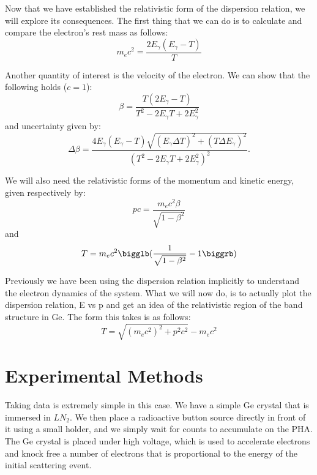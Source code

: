 \documentclass[reprint, nobibnotes, amssymb, amsmath, amsfonts, physics, mathtools, mathrsfs, floatfix]{revtex4-1}
\begin{document}
    Now that we have established the relativistic form of the dispersion relation, we will explore its consequences.  The first thing that we can do is to calculate and compare the electron's rest mass as follows:
    \begin{equation}
      m_ec^2 = \frac{2E_\gamma(E_\gamma - T)}{T} \label{eq:rest_mass}
    \end{equation}

    Another quantity of interest is the velocity of the electron.  We can show that the following holds ($c = 1$):
    \begin{equation}
      \beta = \frac{T(2E_\gamma - T)}{T^2 - 2E_\gamma T + 2E_\gamma^2} \label{eq:velocity}
    \end{equation}
    and uncertainty given by:
    \begin{equation}
      \Delta \beta = \frac{4E_\gamma(E_\gamma - T)\sqrt{(E_\gamma \Delta T)^2 + (T \Delta E_\gamma)^2}}{(T^2 - 2E_\gamma T + 2E_\gamma^2)^2}. \label{eq:dvelocity}
    \end{equation}

    We will also need the relativistic forms of the momentum and kinetic energy, given respectively by:
    \begin{equation}
      pc = \frac{m_ec^2\beta}{\sqrt{1-\beta^2}} \label{eq:momentum}
    \end{equation}
    and
    \begin{equation}
      T = m_ec^2 \bigglb( \frac{1}{\sqrt{1-\beta^2}} - 1 \biggrb) \label{eq:ke}
    \end{equation}

    Previously we have been using the dispersion relation implicitly to understand the electron dynamics of the system.  What we will now do, is to actually plot the dispersion relation, E vs p and get an idea of the relativistic region of the band structure in Ge.  The form this takes is as follows:
    \begin{equation}
      T = \sqrt{(m_ec^2)^2 + p^2c^2} - m_ec^2 \label{eq:dispersion}
    \end{equation}

  \section{Experimental Methods}
    Taking data is extremely simple in this case.  We have a simple Ge crystal that is immersed in $LN_2$.  We then place a radioactive button source directly in front of it using a small holder, and we simply wait for counts to accumulate on the PHA.  The Ge crystal is placed under high voltage, which is used to accelerate electrons and knock free a number of electrons that is proportional to the energy of the initial scattering event.
\end{document}
